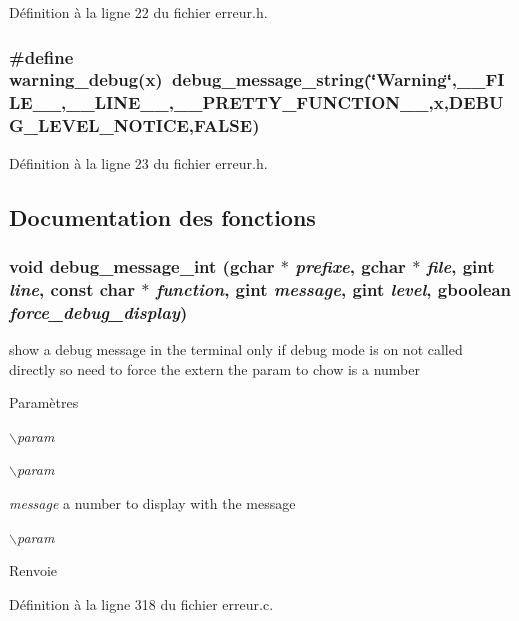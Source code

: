 Définition à la ligne 22 du fichier erreur.h.

\subsubsection[{warning\_\-debug}]{\setlength{\rightskip}{0pt plus 5cm}\#define warning\_\-debug(x)~debug\_\-message\_\-string(\char`\"{}Warning\char`\"{},\_\-\_\-FILE\_\-\_\-,\_\-\_\-LINE\_\-\_\-,\_\-\_\-PRETTY\_\-FUNCTION\_\-\_\-,x,DEBUG\_\-LEVEL\_\-NOTICE,FALSE)}\label{erreur_8h_a70b10c07513d0694ee36dcdcb1696949}


Définition à la ligne 23 du fichier erreur.h.



\subsection{Documentation des fonctions}
\subsubsection[{debug\_\-message\_\-int}]{\setlength{\rightskip}{0pt plus 5cm}void debug\_\-message\_\-int (gchar $\ast$ {\em prefixe}, \/  gchar $\ast$ {\em file}, \/  gint {\em line}, \/  const char $\ast$ {\em function}, \/  gint {\em message}, \/  gint {\em level}, \/  gboolean {\em force\_\-debug\_\-display})}\label{erreur_8h_ae591dcdff555bc84145ac56dd9a29100}
show a debug message in the terminal only if debug mode is on not called directly so need to force the extern the param to chow is a number


\begin{DoxyParams}{Paramètres}
\item[{\em $\backslash$param}]\item[{\em $\backslash$param}]\item[{\em message}]a number to display with the message \item[{\em $\backslash$param}]\end{DoxyParams}
\begin{DoxyReturn}{Renvoie}

\end{DoxyReturn}


Définition à la ligne 318 du fichier erreur.c.

